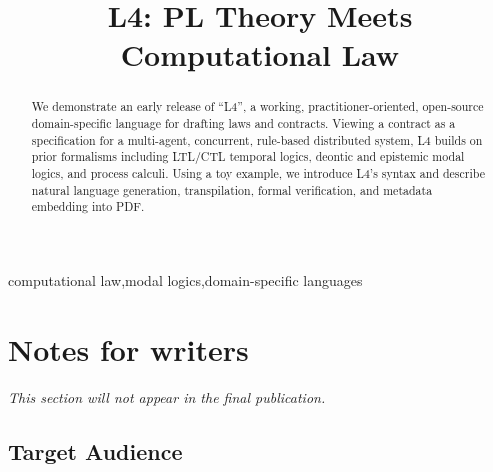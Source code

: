 \documentclass{IOS-Book-Article}
\def\hb{\hbox to 10.7 cm{}}
\begin{document}
\pagestyle{headings}
\def\thepage{}

\begin{frontmatter}              %


\title{L4: PL Theory Meets Computational Law}


\address{Singapore Management University}

\begin{abstract}
We demonstrate an early release of ``L4'', a working, practitioner-oriented, open-source domain-specific language for drafting laws and contracts. Viewing a contract as a specification for a multi-agent, concurrent, rule-based distributed system, L4 builds on prior formalisms including LTL/CTL temporal logics, deontic and epistemic modal logics, and process calculi. Using a toy example, we introduce L4's syntax and describe natural language generation, transpilation, formal verification, and metadata embedding into PDF.
\end{abstract}

\begin{keyword}
computational law\sep modal logics\sep domain-specific languages
\end{keyword}
\end{frontmatter}
\markboth{}{September 2020\hb}
\maketitle

\section{Notes for writers}

\textit{This section will not appear in the final publication.}

\subsection{Target Audience}
\end{document}
